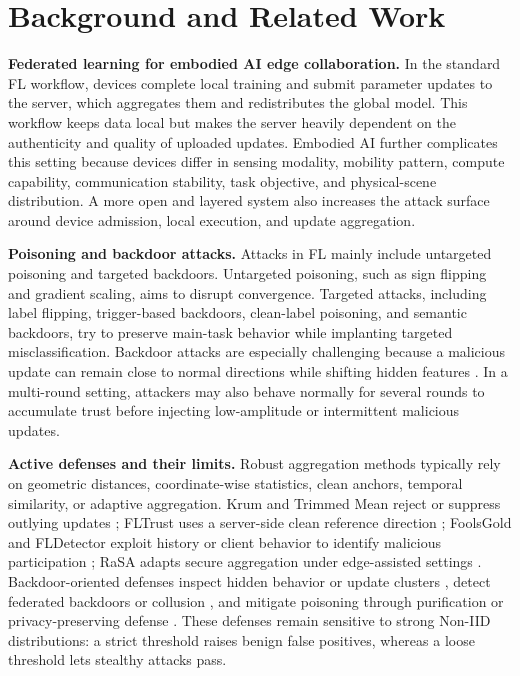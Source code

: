 \documentclass[runningheads,orivec]{llncs}
\begin{document}
\section{Background and Related Work}

\textbf{Federated learning for embodied AI edge collaboration.} In the standard FL workflow, devices complete local training and submit parameter updates to the server, which aggregates them and redistributes the global model. This workflow keeps data local but makes the server heavily dependent on the authenticity and quality of uploaded updates. Embodied AI further complicates this setting because devices differ in sensing modality, mobility pattern, compute capability, communication stability, task objective, and physical-scene distribution. A more open and layered system also increases the attack surface around device admission, local execution, and update aggregation.

\textbf{Poisoning and backdoor attacks.} Attacks in FL mainly include untargeted poisoning and targeted backdoors. Untargeted poisoning, such as sign flipping and gradient scaling, aims to disrupt convergence. Targeted attacks, including label flipping, trigger-based backdoors, clean-label poisoning, and semantic backdoors, try to preserve main-task behavior while implanting targeted misclassification. Backdoor attacks are especially challenging because a malicious update can remain close to normal directions while shifting hidden features \cite{bagdasaryan2020backdoor,wang2019neuralcleanse}. In a multi-round setting, attackers may also behave normally for several rounds to accumulate trust before injecting low-amplitude or intermittent malicious updates.

\textbf{Active defenses and their limits.} Robust aggregation methods typically rely on geometric distances, coordinate-wise statistics, clean anchors, temporal similarity, or adaptive aggregation. Krum and Trimmed Mean reject or suppress outlying updates \cite{blanchard2017krum,yin2018byzantine}; FLTrust uses a server-side clean reference direction \cite{cao2021fltrust}; FoolsGold and FLDetector exploit history or client behavior to identify malicious participation \cite{fung2020foolsgold,fldetector2022}; RaSA adapts secure aggregation under edge-assisted settings \cite{wang2025rasa}. Backdoor-oriented defenses inspect hidden behavior or update clusters \cite{deepsight2022,flame2022}, detect federated backdoors or collusion \cite{crowdguard2024,roseagg}, and mitigate poisoning through purification or privacy-preserving defense \cite{flpurifier,shieldfl}. These defenses remain sensitive to strong Non-IID distributions: a strict threshold raises benign false positives, whereas a loose threshold lets stealthy attacks pass.
\end{document}
